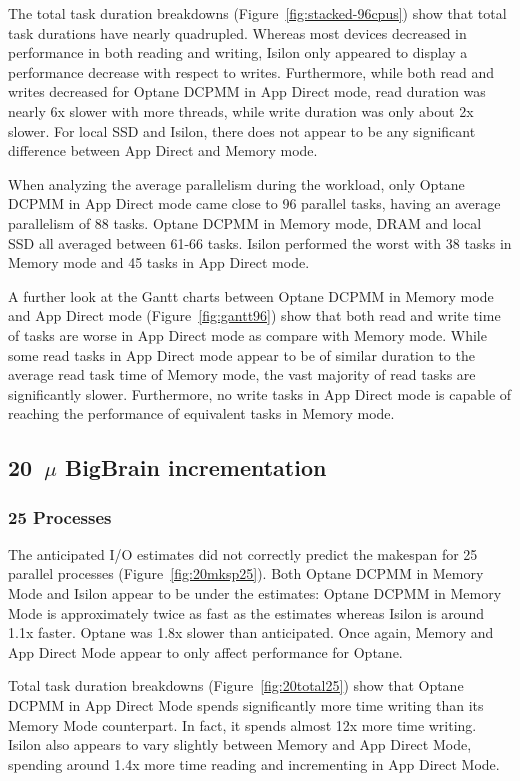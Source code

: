 \documentclass[conference]{IEEEtran}
\newcommand{\bigbrain}{BigBrain\xspace}
\begin{document}
The total task duration breakdowns (Figure~\ref{fig:stacked-96cpus}) show that total task durations
have nearly quadrupled. Whereas most devices decreased in performance in both reading and writing,
Isilon only appeared to display a performance decrease with respect to writes. Furthermore, while both
read and writes decreased for Optane DCPMM in App Direct mode, read duration was nearly 6x slower with more threads,
while write duration was only about 2x slower. For local SSD and Isilon, there does not appear to 
be any significant difference between App Direct and Memory mode.

When analyzing the average parallelism during the workload, only Optane DCPMM in App Direct mode
came close to 96 parallel tasks, having an average parallelism of 88 tasks. Optane DCPMM in Memory mode,
DRAM and local SSD all averaged between 61-66 tasks. Isilon performed the worst with 38 tasks in Memory 
mode and 45 tasks in App Direct mode.

A further look at the Gantt charts between Optane DCPMM in Memory mode and App Direct mode (Figure~\ref{fig:gantt96})
show that both read and write time of tasks are worse in App Direct mode as compare with Memory mode.
While some read tasks in App Direct mode appear to be of similar duration to the average read task time
of Memory mode, the vast majority of read tasks are significantly slower. Furthermore, no write tasks in App
Direct mode is capable of reaching the performance of equivalent tasks in Memory mode.

\subsection{20~$\mu$ \bigbrain incrementation}
\subsubsection{25 Processes}

The anticipated I/O estimates did not correctly predict the makespan for 25 parallel
processes (Figure~\ref{fig:20mksp25}). Both Optane DCPMM in Memory Mode and Isilon appear 
to be under the estimates: Optane DCPMM in Memory Mode is approximately twice as fast as the
estimates whereas Isilon is around 1.1x faster. Optane was 1.8x slower than anticipated.
Once again, Memory and App Direct Mode appear to only affect performance for Optane.

Total task duration breakdowns (Figure~\ref{fig:20total25}) show that Optane DCPMM in
App Direct Mode spends significantly more time writing than its Memory Mode counterpart.
In fact, it spends almost 12x more time writing. Isilon also appears to vary slightly
between Memory and App Direct Mode, spending around 1.4x more time reading and incrementing
in App Direct Mode. 
\end{document}
